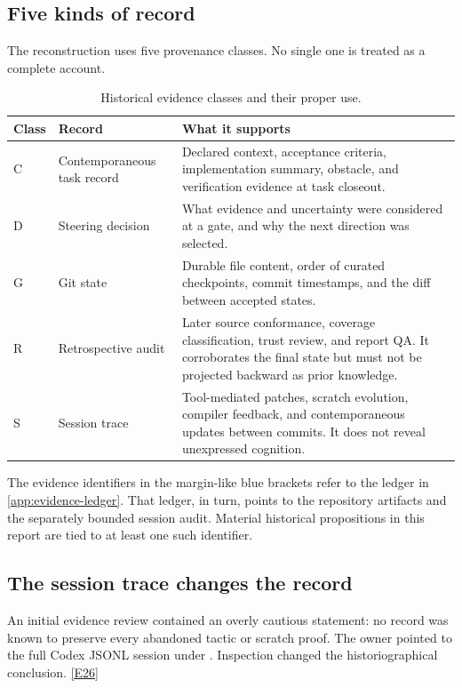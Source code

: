 \documentclass[11pt,a4paper]{article}
\newcommand{\artifact}[1]{\texttt{\detokenize{#1}}}
\newcommand{\ev}[1]{%
  \hyperref[ev:#1]{\textcolor{ReportBlue}{\textsf{\scriptsize[#1]}}}}
\begin{document}
\subsection{Five kinds of record}

The reconstruction uses five provenance classes. No single one is treated as a
complete account.

\begin{table}[htbp]
\centering
\caption{Historical evidence classes and their proper use.}
\label{tab:evidence-classes}
\begin{tabularx}{\linewidth}{@{}C{11mm}L{35mm}Y@{}}
\toprule
\textbf{Class} & \textbf{Record} & \textbf{What it supports} \\
\midrule
C & Contemporaneous task record &
Declared context, acceptance criteria, implementation summary, obstacle, and
verification evidence at task closeout. \\
D & Steering decision &
What evidence and uncertainty were considered at a gate, and why the next direction
was selected. \\
G & Git state &
Durable file content, order of curated checkpoints, commit timestamps, and the diff
between accepted states. \\
R & Retrospective audit &
Later source conformance, coverage classification, trust review, and report QA. It
corroborates the final state but must not be projected backward as prior knowledge. \\
S & Session trace &
Tool-mediated patches, scratch evolution, compiler feedback, and contemporaneous
updates between commits. It does not reveal unexpressed cognition. \\
\bottomrule
\end{tabularx}
\end{table}

The evidence identifiers in the margin-like blue brackets refer to the ledger in
\cref{app:evidence-ledger}. That ledger, in turn, points to the repository artifacts
and the separately bounded session audit. Material historical propositions in this
report are tied to at least one such identifier.

\subsection{The session trace changes the record}

An initial evidence review contained an overly cautious statement: no record was
known to preserve every abandoned tactic or scratch proof. The owner pointed to the
full Codex JSONL session under \artifact{~/.codex/}. Inspection changed the
historiographical conclusion. \ev{E26}
\end{document}
